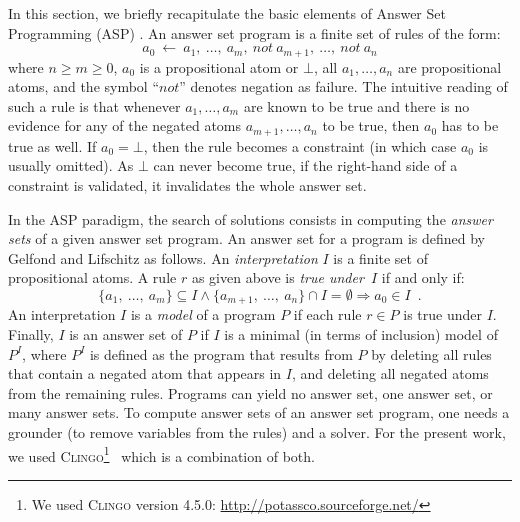 
In this section, we briefly recapitulate the basic elements of Answer Set Programming (ASP) \cite{baral2003knowledge, Vladimir, Glimpse}.
An answer set program is a finite set of rules of the form:
  \[a_{0}\ \leftarrow \ a_{1},\ \ldots,\ a_{m},\ not\ a_{m+1},\ \ldots,\ not\ a_{n}\]
where $n \ge m \ge 0$, $a_{0}$ is a propositional atom or $\bot$, all
$a_{1}, \ldots ,a_{n}$ are propositional atoms, and the symbol ``$not$'' denotes  negation as failure.
The intuitive reading of such a rule is that whenever $a_{1}, \ldots, a_{m}$
are known to be true and there is no evidence for any of the negated atoms $a_{m+1}, \ldots, a_{n}$ to be true, then $a_{0}$ has to be true as well.
If $a_{0} = \bot$, then the rule becomes a constraint (in which case $a_{0}$ is usually omitted).
As $\bot$ can never become true, if the right-hand side of a constraint is validated, it invalidates the whole answer set.

In the ASP paradigm, the search of solutions consists in computing the \emph{answer sets} of a given answer set program.
An answer set for a program is defined by Gelfond and Lifschitz \cite{DBLP:conf/iclp/GelfondL88} as follows.
An \emph{interpretation} $I$ is a finite set of propositional atoms.
A rule $r$ as given above is \emph{true under~$I$} if and only if:
  \[\{a_1,\ \dots,\ a_{m}\} \subseteq I \wedge \{a_{m+1},\ \ldots,\ a_{n}\} \cap I = \emptyset \Rightarrow a_{0} \in I \enspace.\]
An interpretation $I$ is a \emph{model} of a program $P$ if each rule $r \in P$ is true under $I$.
Finally, $I$ is an answer set of $P$ if $I$ is a minimal (in terms of inclusion) model of $P^{I}$,
where $P^{I}$ is defined as the program that results from $P$ by deleting all rules that contain a negated atom that appears in $I$,
and deleting all negated atoms from the remaining rules.
Programs can yield no answer set, one answer set, or many answer sets.
To compute answer sets of an answer set program, one needs a grounder (to remove variables from the rules) and a solver.
For the present work, we used \textsc{Clingo}\footnote{We used \textsc{Clingo} version 4.5.0: \url{http://potassco.sourceforge.net/}}~\cite{gebser2008user, gebser2010incremental} which is a combination of both.
